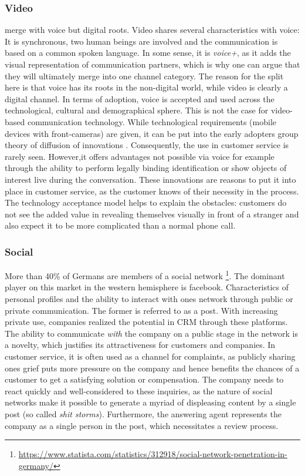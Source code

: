 		
		\subsubsection{Video}
		merge with voice but digital roots. 
		Video shares several characteristics with voice: It is synchronous, two human beings are involved and the communication is based on a common spoken language. In some sense, it is \textit{voice+}, as it adds the visual representation of communication partners, which is why one can argue that they will ultimately merge into one channel category. The reason for the split here is that voice has its roots in the non-digital world, while video is clearly a digital channel. In terms of adoption, voice is accepted and used across the technological, cultural and demographical sphere. This is not the case for video-based communication technology. While technological requirements (\ie mobile devices with front-cameras)  are given, it can be put into the early adopters group \wrt theory of diffusion of innovations \cite{rogers2010diffusion}. Consequently, the use in customer service is rarely seen. However,it offers advantages not possible via voice for example through the ability to perform legally binding identification or show objects of interest live during the conversation. These innovations are reasons to put it into place in customer service, as the customer knows of their necessity in the process. The technology acceptance model \cite{Adams_1992} helps to explain the obstacles: customers do not see the added value in revealing themselves visually in front of a stranger and also expect it to be more complicated than a normal phone call. 
		
		\subsubsection{Social}
		
		More than 40\% of Germans are members of a social network \footnote{\cf \url{https://www.statista.com/statistics/312918/social-network-penetration-in-germany/}}. The dominant player on this market in the western hemisphere is facebook. Characteristics of personal profiles and the ability to interact with ones network through public or private communication. The former is referred to as a post. With increasing private use, companies realized the potential in \acrshort{CRM} through these platforms. The ability to communicate \textit{with} the company on a public stage in the network is a novelty, which justifies its attractiveness for customers and companies. In customer service, it is often used as a channel for complaints, as publicly sharing ones grief puts more pressure on the company and hence benefits the chances of a customer to get a satisfying solution or compensation. The company needs to react quickly and well-considered to these inquiries, as the nature of social networks make it possible to generate a myriad of displeasing content by a single post (so called \textit{shit storms}). Furthermore, the answering agent represents the company as a single person in the post, which necessitates a review process. 
		
